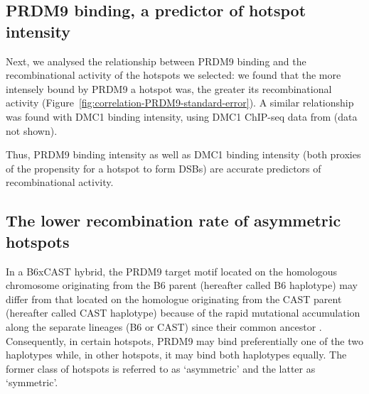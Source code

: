 \subsection{PRDM9 binding, a predictor of hotspot intensity}%

Next, we analysed the relationship between PRDM9 binding and the recombinational activity of the hotspots we selected: we found that the more intensely bound by PRDM9 a hotspot was, the greater its recombinational activity (Figure~\ref{fig:correlation-PRDM9-standard-error}).
A similar relationship was found with DMC1 binding intensity, using DMC1 ChIP-seq data from \citet{smagulova2016evolutionary} (data not shown).

Thus, PRDM9 binding intensity as well as DMC1 binding intensity (both proxies of the propensity for a hotspot to form DSBs) are accurate predictors of recombinational activity.





\subsection{The lower recombination rate of asymmetric hotspots}



In a B6xCAST hybrid, the PRDM9 target motif located on the homologous chromosome originating from the B6 parent (hereafter called B6 haplotype) may differ from that located on the homologue originating from the CAST parent (hereafter called CAST haplotype) because of the rapid mutational accumulation along the separate lineages (B6 or CAST) since their common ancestor \citep{davies2016reengineering,smagulova2016evolutionary}.
Consequently, in certain hotspots, PRDM9 may bind preferentially one of the two haplotypes while, in other hotspots, it may bind both haplotypes equally.
The former class of hotspots is referred to as ‘asymmetric’ and the latter as ‘symmetric’.

